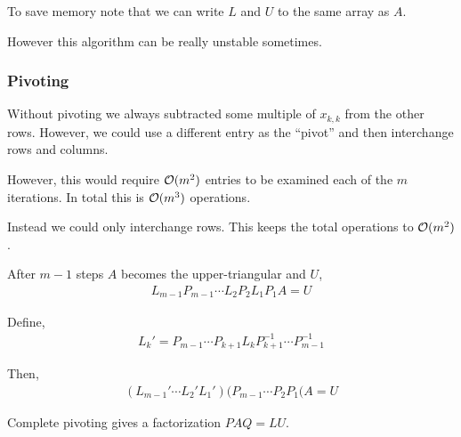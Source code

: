 \documentclass[12pt]{article}
\begin{document}
To save memory note that we can write \( L \) and \( U \) to the same array as \( A \).

However this algorithm can be really unstable sometimes.


\subsubsection{Pivoting}
Without pivoting we always subtracted some multiple of \( x_{k,k} \) from the other rows. However, we could use a different entry as the ``pivot'' and then interchange rows and columns.

However, this would require \( \mathcal{O}(m^2) \) entries to be examined each of the \( m \) iterations. In total this is \( \mathcal{O}(m^3) \) operations.

Instead we could only interchange rows. This keeps the total operations to \( \mathcal{O}(m^2) \).

After \( m-1 \) steps \( A \) becomes the upper-triangular and \( U \),
\begin{align*}
    L_{m-1}P_{m-1} \cdots L_2P_2L_1P_1 A = U
\end{align*}

Define,
\begin{align*}
    L_k' = P_{m-1} \cdots P_{k+1}L_k P_{k+1}^{-1} \cdots P_{m-1}^{-1}
\end{align*}

Then,
\begin{align*}
    (L_{m-1}' \cdots L_2'L_1')(P_{m-1} \cdots P_2P_1(A = U
\end{align*}

\begin{algorithm}
\begin{algorithmic}
    \EndFor
\EndFor
\end{algorithmic}
\end{algorithm}

Complete pivoting gives a factorization \( PAQ = LU \).
\end{document}
